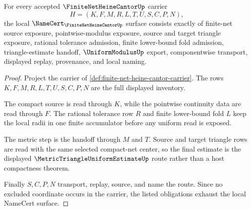 \begin{theorem}
\label{thm:finite-net-heine-cantor-namecert-obligations}
For every accepted $\FiniteNetHeineCantorUp$ carrier
$$
H=(K,F,M,R,L,T,U,S,C,P,N),
$$
the local $\NameCert_{\FiniteNetHeineCantorUp}$ surface consists exactly of finite-net source exposure, pointwise-modulus exposure, source and target triangle exposure, rational tolerance admission, finite lower-bound fold admission, triangle-estimate handoff, $\UniformModulusUp$ export, componentwise transport, displayed replay, provenance, and local naming.
\end{theorem}
\begin{proof}
Project the carrier of \autoref{def:finite-net-heine-cantor-carrier}. The rows $K,F,M,R,L,T,U,S,C,P,N$ are the full displayed inventory.

The compact source is read through $K$, while the pointwise continuity data are read through $F$. The rational tolerance row $R$ and finite lower-bound fold $L$ keep the local radii in one finite accumulator before any uniform read is exposed.

The metric step is the handoff through $M$ and $T$. Source and target triangle rows are read with the same selected compact-net center, so the final estimate is the displayed $\MetricTriangleUniformEstimateUp$ route rather than a host compactness theorem.

Finally $S,C,P,N$ transport, replay, source, and name the route. Since no excluded coordinate occurs in the carrier, the listed obligations exhaust the local NameCert surface.
\end{proof}

